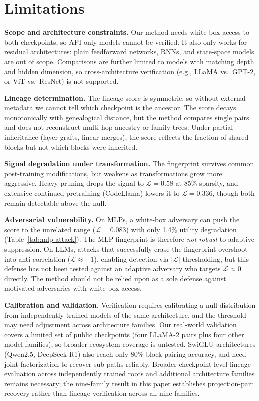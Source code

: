 \appendix

\section{Limitations}\label{app:limitations}

\textbf{Scope and architecture constraints.} Our method needs white-box access to both checkpoints, so API-only models cannot be verified. It also only works for residual architectures: plain feedforward networks, RNNs, and state-space models are out of scope. Comparisons are further limited to models with matching depth and hidden dimension, so cross-architecture verification (e.g., LLaMA vs.\ GPT-2, or ViT vs.\ ResNet) is not supported.

\textbf{Lineage determination.} The lineage score is symmetric, so without external metadata we cannot tell which checkpoint is the ancestor. The score decays monotonically with genealogical distance, but the method compares single pairs and does not reconstruct multi-hop ancestry or family trees. Under partial inheritance (layer grafts, linear merges), the score reflects the fraction of shared blocks but not which blocks were inherited.

\textbf{Signal degradation under transformation.} The fingerprint survives common post-training modifications, but weakens as transformations grow more aggressive. Heavy pruning drops the signal to $\mathcal{L}=0.58$ at 85\% sparsity, and extensive continued pretraining (CodeLlama) lowers it to $\mathcal{L}=0.336$, though both remain detectable above the null.

\textbf{Adversarial vulnerability.} On MLPs, a white-box adversary can push the score to the unrelated range ($\mathcal{L} = 0.083$) with only 1.4\% utility degradation (Table~\ref{tab:mlp-attack}). The MLP fingerprint is therefore \emph{not robust} to adaptive suppression. On LLMs, attacks that successfully erase the fingerprint overshoot into anti-correlation ($\mathcal{L} \approx -1$), enabling detection via $|\mathcal{L}|$ thresholding, but this defense has not been tested against an adaptive adversary who targets $\mathcal{L} \approx 0$ directly. The method should not be relied upon as a sole defense against motivated adversaries with white-box access.

\textbf{Calibration and validation.} Verification requires calibrating a null distribution from independently trained models of the same architecture, and the threshold may need adjustment across architecture families. Our real-world validation covers a limited set of public checkpoints (four LLaMA-2 pairs plus four other model families), so broader ecosystem coverage is untested. SwiGLU architectures (Qwen2.5, DeepSeek-R1) also reach only 80\% block-pairing accuracy, and need joint factorization to recover sub-paths reliably. Broader checkpoint-level lineage evaluation across independently trained roots and additional architecture families remains necessary; the nine-family result in this paper establishes projection-pair recovery rather than lineage verification across all nine families.

